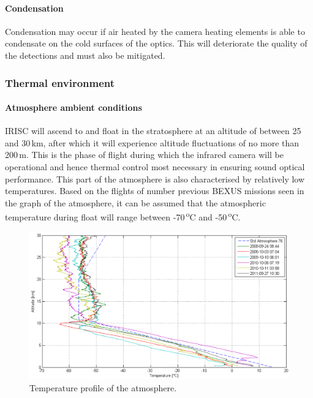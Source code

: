 \paragraph{Condensation}
Condensation may occur if air heated by the camera heating elements is able to condensate on the cold surfaces of the optics. This will deteriorate the quality of the detections and must also be mitigated.  \

\subsubsection{Thermal environment}
\paragraph{Atmosphere ambient conditions}
IRISC will ascend to and float in the stratosphere at an altitude of between 25 and 30\,km, after which it will experience altitude fluctuations of no more than 200\,m. This is the phase of flight during which the infrared camera will be operational and hence thermal control most necessary in ensuring sound optical performance. This part of the atmosphere is also characterised by relatively low temperatures. Based on the flights of number previous BEXUS missions seen in the graph of the atmosphere, it can be assumed that the atmospheric temperature during float will range between -70\,\textsuperscript{o}C and -50\,\textsuperscript{o}C. \\

	\begin{figure}[h!]
    \centering
    \includegraphics[scale=0.6]{4-experiment-design/img/mechanical/atmosphere.PNG}
	\caption{Temperature profile of the atmosphere.}
	\label{fig:atmosphere}
	\end{figure}
	
